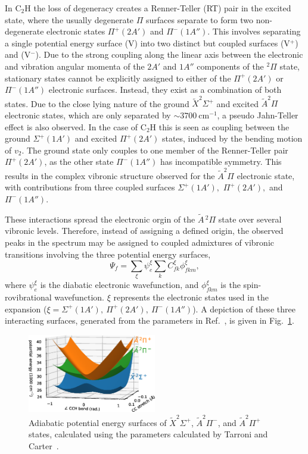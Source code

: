\documentclass[aip,graphicx]{revtex4-1}
\begin{document}
In C$_2$H the loss of degeneracy creates a Renner-Teller (RT) pair in the excited state, where the usually degenerate $\Pi$ surfaces separate to form two non-degenerate electronic states $\Pi^+ (2A')$ and $\Pi^-(1A'')$. This involves separating a single potential energy surface (V) into two distinct but coupled surfaces (V$^+$) and (V$^-$). Due to the strong coupling along the linear axis between the electronic and vibration angular momenta of the $2A'$ and $1A''$ components of the $^2\Pi$ state, stationary states cannot be explicitly assigned to either of the $\Pi^+(2A')$ or $\Pi^-(1A'')$ electronic surfaces. Instead, they exist as a combination of both states. Due to the close lying nature of the ground {$\tilde{X} ^2\Sigma^+$} and excited {$\tilde{A} ^2\Pi$} electronic states, which are only separated by $\sim3700~$cm$^{-1}$, a pseudo Jahn-Teller effect is also observed. In the case of C$_2$H this is seen as coupling between the ground $\Sigma^+(1A')$ and excited $\Pi^+(2A')$ states, induced by the bending motion of $v_2$. The ground state only couples to one member of the Renner-Teller pair $\Pi^+(2A')$, as the other state $\Pi^-(1A'')$ has incompatible symmetry. This results in the complex vibronic structure observed for the $\tilde{A}^2\Pi$ electronic state, with contributions from three coupled surfaces $\Sigma^+(1A'),$ $\Pi^+(2A'),$ and $\Pi^-(1A'')$.

These interactions spread the electronic orgin of the $\tilde{A}\,^2\Pi$ state over several vibronic levels. Therefore, instead of assigning a defined origin, the observed peaks in the spectrum may be assigned to coupled admixtures of vibronic transitions involving the three potential energy surfaces,
\begin{equation}
\Psi_f = \sum_\xi \psi_e^\xi \sum_k C_{fk}^\xi\phi_{fkm}^\xi,
\label{eq:teller3} 
\end{equation}
where $\psi_e^\xi$ is the diabatic electronic wavefunction, and $\phi_{fkm}^\xi$ is the spin-rovibrational wavefunction. $\xi$ represents the electronic states used in the expansion ($\xi=\Sigma^+(1A'),~\Pi^+(2A'),~\Pi^-(1A'')$). A depiction of these three interacting surfaces, generated from the parameters in Ref.~, is given in Fig.~\ref{fig:2}.

\begin{figure}
	\centering
	\includegraphics[width=0.5\textwidth]{figures/Fig2}
	\caption{Adiabatic potential energy surfaces of $\tilde{X}^2\Sigma^+$, $\tilde{A}^2\Pi^-$, and $\tilde{A}^2\Pi^+$ states, calculated using the parameters calculated by Tarroni and Carter~\cite{tar03}.}
	\label{fig:2}
\end{figure}
\end{document}
